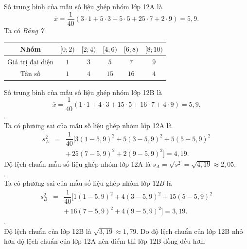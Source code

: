 \begin{ex}
{\begin{itemchoice}
\begin{center}
\begin{tabular}{|c|c|c|c|c|c|}
					\hline 
				\end{tabular}
			\end{center}
			Số trung bình của mẫu số liệu ghép nhóm lớp 12A là 
			\[ 
			\overline{x}=\dfrac{1}{40}\left(3\cdot 1+5\cdot 3+5\cdot 5+25\cdot  7+2\cdot 9\right)=5{,}9.
			 \]
			Ta có  \textit{Bảng 7}
			\begin{center}
				\begin{tabular}{|c|c|c|c|c|c|}
					\hline 
					Nhóm  &$[0;2)$&$[2;4)$&$[4;6)$&$[6;8)$&$[8;10)$\\
					\hline 
					Giá trị đại diện  & $1$&$3$&$5$&$7$&$9$\\
					\hline 
					Tần số&$1$&$4$&$15$&$16$&$4$\\ 
					 \hline
				\end{tabular}
			\end{center}
			 Số trung bình của mẫu số liệu ghép nhóm lớp 12B là
			 \[
			\overline{x}  = \dfrac{1}{40}\left(1\cdot 1+4\cdot 3+15\cdot 5+16\cdot 7+4\cdot 9\right) =5{,}9.
			\] 
			. \\ 
			Ta  có phương sai của mẫu số liệu ghép nhóm lớp 12A là
			 \allowdisplaybreaks
			\begin{eqnarray*}
				 s_A^2 &=& \dfrac{1}{40}\big[3(1-5{,}9)^2+5(3-5{,}9)^2+5(5-5{,}9)^2 \\
				&&+\, 25(7-5{,}9)^2+2(9-5{,}9)^2 
				 \big]=4{,}19.
			\end{eqnarray*}
			Độ lệch chuẩn mẫu số liệu ghép  nhóm lớp 12A là $s_A=\sqrt{s^2}=\sqrt{4{,}19}\approx 2{,}05$.\\
			. \\ 
			Ta có  phương sai của mẫu số liệu ghép nhóm lớp $12B$ là
			\allowdisplaybreaks 
			\begin{eqnarray*}
				s_B^2 &=& \dfrac{1}{40}\big[1(1-5{,}9)^2+4(3-5{,}9)^2+15(5-5{,}9)^2  \\
				&&+\,16(7-5{,}9)^2+4(9-5{,}9)^2 
				 \big]=3{,}19.
			\end{eqnarray*}
			. \\
			Độ lệch chuẩn của lớp 12B là $\sqrt{3{,}19}\approx 1{,}79$. Do độ lệch chuẩn của lớp 12B nhỏ hơn độ lệch chuẩn của lớp 12A nên điểm thi lớp 12B đồng đều hơn. 
		\end{itemchoice}
	 }
\end{ex}




